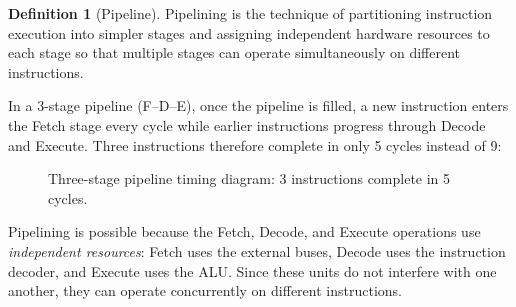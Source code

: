 \documentclass[11pt, a4paper, notitlepage]{report}
\theoremstyle{definition}
\newtheorem{definition}[theorem]{Definition}
\theoremstyle{remark}
\theoremstyle{definition}
\begin{document}
\begin{definition}[Pipeline]
\label{def:pipeline}
  Pipelining is the technique of partitioning instruction execution into simpler stages and assigning independent hardware resources to each stage so that multiple stages can operate simultaneously on different instructions.
\end{definition}

In a 3-stage pipeline (F--D--E), once the pipeline is filled, a new instruction enters the Fetch stage every cycle while earlier instructions progress through Decode and Execute. Three instructions therefore complete in only 5 cycles instead of 9:

\begin{figure}[h]
\centering
{}
\caption{Three-stage pipeline timing diagram: 3 instructions complete in 5 cycles.}
\label{fig:pipeline-3stage}
\end{figure}

Pipelining is possible because the Fetch, Decode, and Execute operations use \emph{independent resources}: Fetch uses the external buses, Decode uses the instruction decoder, and Execute uses the ALU. Since these units do not interfere with one another, they can operate concurrently on different instructions.
\end{document}
